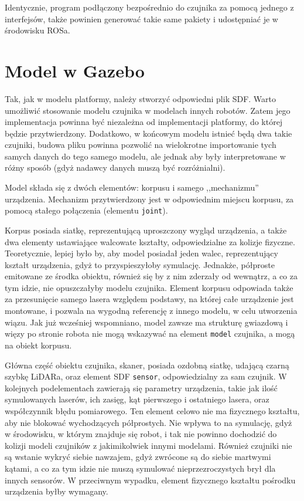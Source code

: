 	Identycznie, program podłączony bezpośrednio do czujnika za pomocą jednego z interfejsów, także powinien generować takie same pakiety i udostępniać je w środowisku ROSa.

\section{Model w Gazebo}
	Tak, jak w modelu platformy, należy stworzyć odpowiedni plik SDF. 
	Warto umożliwić stosowanie modelu czujnika w modelach innych robotów. 
	Zatem jego implementacja powinna być niezależna od implementacji platformy, do której będzie przytwierdzony.
	Dodatkowo, w końcowym modelu istnieć będą dwa takie czujniki, budowa pliku powinna pozwolić na wielokrotne importowanie tych samych danych do tego samego modelu, 
	ale jednak aby były interpretowane w różny sposób (gdyż nadawcy danych muszą być rozróżnialni).

	Model składa się z dwóch elementów: korpusu i samego ,,mechanizmu'' urządzenia.
	Mechanizm przytwierdzony jest w odpowiednim miejscu korpusu, za pomocą stałego połączenia (elementu \texttt{joint}).

	Korpus posiada siatkę, reprezentującą uproszczony wygląd urządzenia, a także dwa elementy ustawiające walcowate kształty, odpowiedzialne za kolizje fizyczne.
	Teoretycznie, lepiej było by, aby model posiadał jeden walec, reprezentujący kształt urządzenia, gdyż to przyspieszyłoby symulację. 
	Jednakże, półproste emitowane ze środka obiektu, również się by z nim zderzały od wewnątrz, a co za tym idzie, nie opuszczałyby modelu czujnika.
	Element korpusu odpowiada także za przesunięcie samego lasera względem podstawy, na której całe urządzenie jest montowane, i 
	pozwala na wygodną referencję z innego modelu, w celu utworzenia wiązu.
	Jak już wcześniej wspomniano, model zawsze ma strukturę gwiazdową i więzy po stronie robota nie mogą wskazywać na element \texttt{model} czujnika, a mogą
	na obiekt korpusu.

	Główna część obiektu czujnika, skaner, posiada ozdobną siatkę, udającą czarną szybkę LiDARa, oraz element SDF \texttt{sensor}, odpowiedzialny za sam czujnik.
	W kolejnych podelementach zawierają się parametry urządzenia, takie jak ilość symulowanych laserów, ich zasięg, kąt pierwszego i ostatniego lasera, oraz współczynnik błędu pomiarowego. Ten element celowo nie ma fizycznego kształtu, aby nie blokować wychodzących półprostych. 
	Nie wpływa to na symulację, gdyż w środowisku, w którym znajduje się robot, i tak nie powinno dochodzić do kolizji modeli czujników z jakimikolwiek innymi modelami.
	Również czujniki nie są wstanie wykryć siebie nawzajem, gdyż zwrócone są do siebie martwymi kątami, a co za tym idzie nie muszą symulować nieprzezroczystych brył dla
	innych sensorów.
	W przeciwnym wypadku, element fizycznego kształtu pośrodku urządzenia byłby wymagany.

